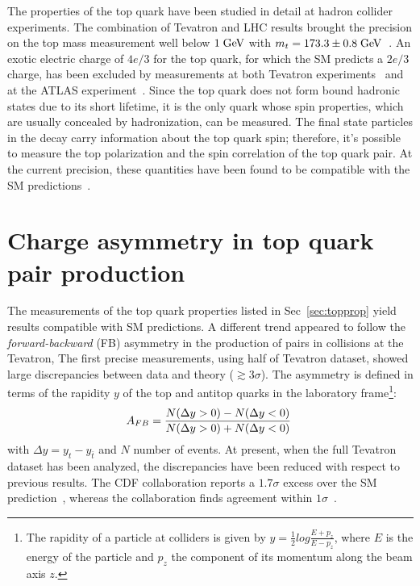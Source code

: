 The properties of the top quark have been studied in detail at hadron
collider experiments. The combination of Tevatron and LHC results
brought the precision on the top mass measurement well below $1 \; \mathrm{GeV}{}$
with $m_t=173.3\pm{}0.8 \; \mathrm{GeV}{}$~\cite{topmass}.
An exotic electric charge of $4e/3$ for the top quark, for which the
SM predicts a $2e/3$ charge, has been excluded by measurements at both
Tevatron experiments~\cite{Abazov:2006vd,Aaltonen:2010js} and at the
ATLAS experiment~\cite{Aad:2013uza}.
Since the top quark does not form bound hadronic states due to its
short lifetime, it is the only quark whose spin properties, which are usually
concealed by hadronization, can be measured. The final state
particles in the decay carry information about the top quark spin;
therefore, it's possible to measure the top polarization and the spin
correlation of the top quark pair. At the current precision, these
quantities have been found to be compatible with the SM
predictions~\cite{Aad:2013ksa,Aad:2014pwa,Chatrchyan:2013wua}. 

\section{Charge asymmetry in top quark pair production}
\label{sec:topca}

The measurements of the top quark properties listed in
Sec~\ref{sec:topprop} yield results compatible with SM predictions.
A different trend appeared to follow the {\it forward-backward}
(FB) asymmetry in the production of \ttbar{} pairs in \ppbar{}
collisions at the Tevatron, The first precise measurements, using half
of Tevatron dataset, showed large discrepancies between
data and theory ($\gtrsim 3\sigma$). 
The asymmetry \afb{} is defined in terms of the rapidity $y$ of the top and
antitop quarks in the laboratory frame\footnote{The rapidity of a
  particle at colliders is given by $y=\frac{1}{2}log\frac{E+p_z}{E-p_z}$, where
  $E$ is the energy of the particle and $p_z$ the component of its
  momentum along the beam axis $z$.}: 
\begin{equation}
\label{eq:afb}
\mbox{$A_{FB}$}{}=\frac{N(\Delta{}y>0)-N(\Delta{}y<0)}{N(\Delta{}y>0)+N(\Delta{}y<0)}
\phantom{,}
\end{equation}
with $\Delta{}y=y_t - y_{\bar{t}}$ and $N$ number of events.
At present, when the full Tevatron dataset has been analyzed, the
discrepancies have been reduced with respect to previous results. The
CDF collaboration reports a $1.7\sigma$ excess over the SM
prediction~\cite{Aaltonen:2012it}, whereas the \dzero{} collaboration
finds agreement within $1\sigma$~\cite{Abazov:2014cca}.

